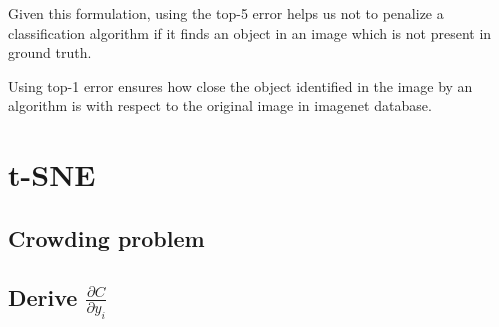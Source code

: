 \documentclass{article}
\begin{document}
Given this formulation, using the top-5 error helps us not to penalize a classification algorithm if it finds an object in an image which is not present in ground truth.

Using top-1 error ensures how close the object identified in the image by an algorithm is with respect to the original image in imagenet database.

\section{t-SNE}
\subsection{Crowding problem}
\subsection{Derive $\frac{\partial C}{\partial y_{i}}$}



\end{document}
